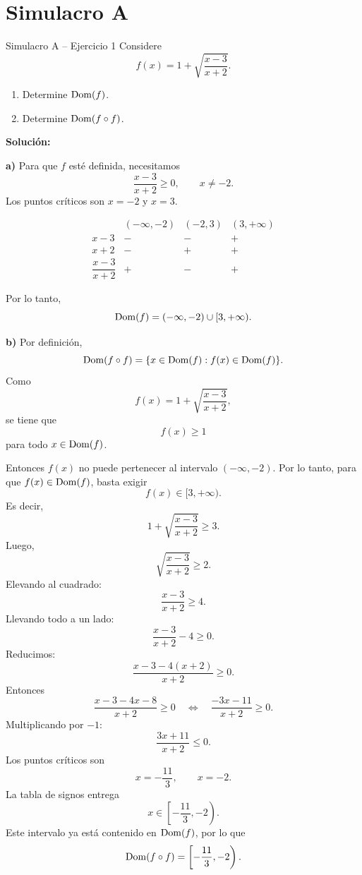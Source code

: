 \documentclass[letterpaper, 12pt]{article}
\begin{document}

\section*{Simulacro A}

\begin{solucionbox}{Simulacro A -- Ejercicio 1}
Considere
\[
    f(x)=1+\sqrt{\frac{x-3}{x+2}}.
\]
\begin{enumerate}[label=\textbf{\alph*)}]
    \item Determine $\operatorname{Dom}(f)$.
    \item Determine $\operatorname{Dom}(f\circ f)$.
\end{enumerate}

\textbf{Soluci\'on:}

\textbf{a)} Para que $f$ est\'e definida, necesitamos
\[
    \frac{x-3}{x+2}\geq0,
    \qquad x\neq -2.
\]
Los puntos cr\'iticos son $x=-2$ y $x=3$.

\[
\begin{array}{c|ccc}
    & (-\infty,-2) & (-2,3) & (3,+\infty) \\ \hline
    x-3 & - & - & + \\
    x+2 & - & + & + \\ \hline
    \dfrac{x-3}{x+2} & + & - & +
\end{array}
\]

Por lo tanto,
\[
    \operatorname{Dom}(f)=(-\infty,-2)\cup[3,+\infty).
\]

\textbf{b)} Por definici\'on,
\[
    \operatorname{Dom}(f\circ f)=\{x\in\operatorname{Dom}(f):f(x)\in\operatorname{Dom}(f)\}.
\]
Como
\[
    f(x)=1+\sqrt{\frac{x-3}{x+2}},
\]
se tiene que
\[
    f(x)\geq 1
\]
para todo $x\in\operatorname{Dom}(f)$.

Entonces $f(x)$ no puede pertenecer al intervalo $(-\infty,-2)$. Por lo tanto, para que $f(x)\in\operatorname{Dom}(f)$, basta exigir
\[
    f(x)\in[3,+\infty).
\]
Es decir,
\[
    1+\sqrt{\frac{x-3}{x+2}}\geq3.
\]
Luego,
\[
    \sqrt{\frac{x-3}{x+2}}\geq2.
\]
Elevando al cuadrado:
\[
    \frac{x-3}{x+2}\geq4.
\]
Llevando todo a un lado:
\[
    \frac{x-3}{x+2}-4\geq0.
\]
Reducimos:
\[
    \frac{x-3-4(x+2)}{x+2}\geq0.
\]
Entonces
\[
    \frac{x-3-4x-8}{x+2}\geq0
    \quad\Longleftrightarrow\quad
    \frac{-3x-11}{x+2}\geq0.
\]
Multiplicando por $-1$:
\[
    \frac{3x+11}{x+2}\leq0.
\]
Los puntos cr\'iticos son
\[
    x=-\frac{11}{3},\qquad x=-2.
\]
La tabla de signos entrega
\[
    x\in\left[-\frac{11}{3},-2\right).
\]
Este intervalo ya est\'a contenido en $\operatorname{Dom}(f)$, por lo que
\[
    \operatorname{Dom}(f\circ f)=\left[-\frac{11}{3},-2\right).
\]

\respuesta{$\Dom(f)=(-\infty,-2)\cup[3,+\infty)$ y $\Dom(f\circ f)=\left[-\dfrac{11}{3},-2\right)$.}
\end{solucionbox}
\end{document}
